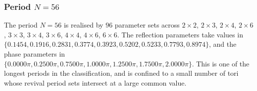 \par
\subsubsection{Period $N = 56$}
The period $N=56$ is realised by $96$ parameter sets across $2\times2$, $2\times3$, $2\times4$, $2\times6$, $3\times3$, $3\times4$, $3\times6$, $4\times4$, $4\times6$, $6\times6$. The reflection parameters take values in $\{0.1454, 0.1916, 0.2831, 0.3774, 0.3923, 0.5202, 0.5233, 0.7793, 0.8974\}$, and the phase parameters in $\{0.0000\pi, 0.2500\pi, 0.7500\pi, 1.0000\pi, 1.2500\pi, 1.7500\pi, 2.0000\pi\}$. This is one of the longest periods in the classification,
and is confined to a small number of tori whose revival
period sets intersect at a large common value.

